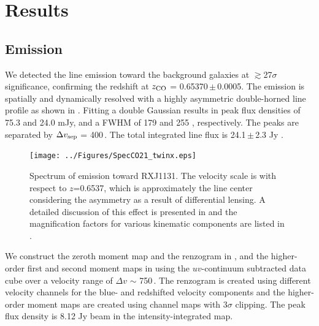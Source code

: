 \documentclass[]{emulateapj}
\begin{document}
\section{Results} \label{sec:results}
\subsection{\bco Emission} \label{sec:CO21} %
We detected the \bco line emission toward the background galaxies
at $\gtrsim$27$\sigma$ significance, confirming the redshift at $z_{\rm CO}$ =
0.65370\,$\pm$\,0.0005. The emission is spatially and dynamically resolved
with a highly asymmetric double-horned line profile
as shown in . Fitting a double Gaussian results in peak
flux densities of 75.3 and 24.0 mJy, and a FWHM of
179 \kms and 255 \kms, respectively. The peaks are separated by
$\Delta v_{\rm sep}$ = 400\,\kms. The total integrated line flux is 24.1\,$\pm$\,2.3 Jy \kms. %

\begin{figure}[!htbp]
\centering
\texttt{[image: ../Figures/SpecCO21\_twinx.eps]}
\caption{ Spectrum of \bco emission toward RXJ1131. The velocity scale
is with respect to $z$=0.6537, which is approximately the line center
considering the asymmetry as a result of differential lensing.
A detailed discussion of this effect is presented in
 and the magnification factors for various kinematic
components are listed in .
 \label{fig:CO21spec}}
\end{figure}

We construct the zeroth moment map and the renzogram in , and
the higher-order first and second moment maps in 
using the $uv$-continuum subtracted data cube over a velocity range of
$\Delta v$ $\sim$ 750\,\kms.
The renzogram is created using different velocity channels for the blue- and
redshifted velocity components and
the higher-order moment maps are created using
channel maps with 3$\sigma$ clipping.
The peak flux density is 8.12 Jy\,\kms\,beam\pmOne
in the intensity-integrated map.
\end{document}
